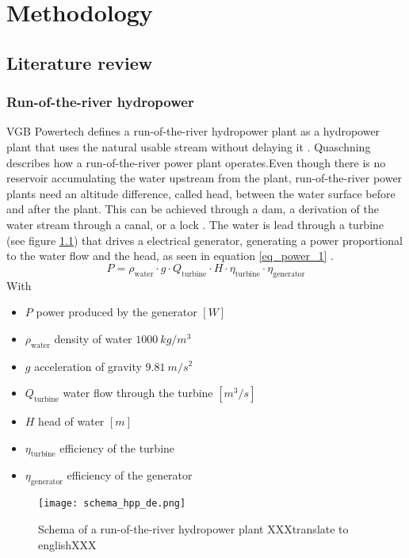 \chapter{Methodology}
\label{chap:methodology}

\section{Literature review}
\subsection{Run-of-the-river hydropower}
VGB Powertech defines a run-of-the-river hydropower plant as a hydropower plant that uses the natural usable stream without delaying it \cite{vgb}. \newline
Quaschning \cite{quaschning} describes how a run-of-the-river power plant operates.Even though there is no reservoir accumulating the water upstream from the plant, run-of-the-river power plants need an altitude difference, called head, between the water surface before and after the plant. This can be achieved through a dam, a derivation of the water stream through a canal, or a lock \cite{tdi_petites_centrales}. The water is lead through a turbine (see figure \ref{schema_hpp}) that drives a electrical generator, generating a power proportional to the water flow and the head, as seen in equation \ref{eq_power_1} \cite{quaschning}.
\begin{equation}
\label{eq_power_1} 
 P = \rho_\mathrm{water} \cdot g \cdot Q_\mathrm{turbine} \cdot H \cdot \eta_\mathrm{turbine} \cdot \eta_\mathrm{generator}
\end{equation}
With 
\begin{itemize}
\itemsep0em 
 \item $P$ \tabto{4cm} power produced by the generator \tabto{12cm} $[W]$
 \item $\rho_\mathrm{water}$ \tabto{4cm} density of water \tabto{12cm} $1000 \ kg/m^3$
 \item $g$ \tabto{4cm} acceleration of gravity \tabto{12cm} $9.81 \ m/s^2$
 \item $Q_\mathrm{turbine}$ \tabto{4cm} water flow through the turbine \tabto{12cm} $[m^3/s]$
 \item $H$ \tabto{4cm} head of water \tabto{12cm} $[m]$
 \item $\eta_\mathrm{turbine}$ \tabto{4cm} efficiency of the turbine
 \item $\eta_\mathrm{generator}$ \tabto{4cm} efficiency of the generator
\end{itemize}
\begin{figure}[h]
\texttt{[image: schema\_hpp\_de.png]}
\caption[Schema of a run-of-the-river hydropower plant]{Schema of a run-of-the-river hydropower plant \cite{quaschning} XXXtranslate to englishXXX}
\centering
\label{schema_hpp}
\end{figure}

